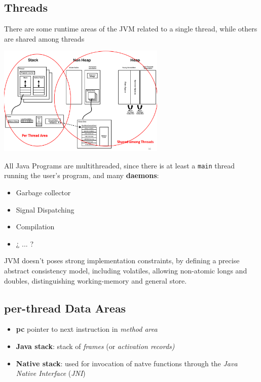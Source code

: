 \subsection{Threads}
There are some runtime areas of the JVM related to a single thread, while others are shared among threads

\begin{center}
    \includegraphics[width=0.6\textwidth]{images/JVM_Runtime_areas.png}
\end{center}
All Java Programs are multithreaded, since there is at least a \lstinline{main} thread running the user's program, and many \textbf{daemons}:
\begin{itemize}
    \item Garbage collector
    \item Signal Dispatching
    \item Compilation
    \item ¿ ... ?
\end{itemize}
JVM doesn't poses strong implementation constraints, by defining a precise abstract consistency model, including volatiles, allowing non-atomic longs and doubles, distinguishing working-memory and general store.


\subsection{per-thread Data Areas}
\begin{itemize}
    \item \textbf{pc} pointer to next instruction in \textit{method area}
    \item \textbf{Java stack}: stack of \textit{frames} (or \textit{activation records)}
    \item \textbf{Native stack}: used for invocation of natve functions through the \textit{Java Native Interface} (\textit{JNI})
\end{itemize}


